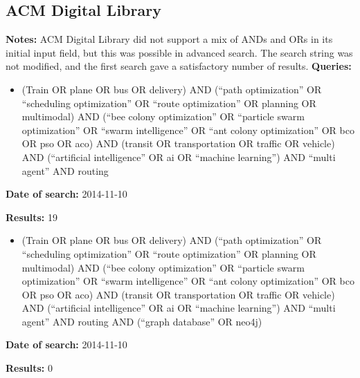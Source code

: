 \subsection{ACM Digital Library}
\textbf{Notes:} ACM Digital Library did not support a mix of ANDs and ORs in its initial input field, but this was possible in advanced search. The search string was not modified, and the first search gave a satisfactory number of results. 
\newline
\newline
\textbf{Queries:}
\begin{itemize}
\item (Train OR plane OR bus OR delivery) AND (``path optimization'' OR ``scheduling optimization'' OR ``route optimization'' OR planning OR multimodal) AND (``bee colony optimization'' OR ``particle swarm optimization'' OR ``swarm intelligence'' OR ``ant colony optimization'' OR bco OR pso OR aco) AND (transit OR transportation OR traffic OR vehicle) AND (``artificial intelligence'' OR ai OR ``machine learning'') AND ``multi agent'' AND routing
\end{itemize}
\par \textbf{Date of search:} 2014-11-10 
\par \textbf{Results:} 19
\begin{itemize}
\item (Train OR plane OR bus OR delivery) AND (``path optimization'' OR ``scheduling optimization'' OR ``route optimization'' OR planning OR multimodal) AND (``bee colony optimization'' OR ``particle swarm optimization'' OR ``swarm intelligence'' OR ``ant colony optimization'' OR bco OR pso OR aco) AND (transit OR transportation OR traffic OR vehicle) AND (``artificial intelligence'' OR ai OR ``machine learning'') AND ``multi agent'' AND routing AND (``graph database'' OR neo4j)
\end{itemize}
\par \textbf{Date of search:} 2014-11-10 
\par \textbf{Results:} 0


